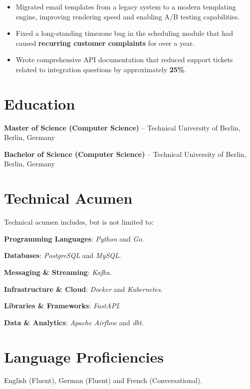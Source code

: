\documentclass{custom}
\begin{document}
\begin{itemize}\setlength{\itemsep}{-2pt}
\item Migrated email templates from a legacy system to a modern templating engine,
improving rendering speed and enabling A/B testing capabilities.
\item Fixed a long-standing timezone bug in the scheduling module that had caused
\textbf{recurring customer complaints} for over a year.
\item Wrote comprehensive API documentation that reduced support tickets related
to integration questions by approximately \textbf{25\%}.
\end{itemize}
\priorheading
{}
\section{Education}
\label{education}
\textbf{Master of Science (Computer Science)} – Technical University of Berlin,
Berlin, Germany

\textbf{Bachelor of Science (Computer Science)} – Technical University of Berlin,
Berlin, Germany
\section{Technical Acumen}
\label{technical-acumen}
Technical acumen includes, but is not limited to:

\textbf{Programming Languages}: \emph{Python} and \emph{Go}.

\textbf{Databases}: \emph{PostgreSQL} and \emph{MySQL}.

\textbf{Messaging \& Streaming}: \emph{Kafka}.

\textbf{Infrastructure \& Cloud}: \emph{Docker} and \emph{Kubernetes}.

\textbf{Libraries \& Frameworks}: \emph{FastAPI}.

\textbf{Data \& Analytics}: \emph{Apache Airflow} and \emph{dbt}.
\section{Language Proficiencies}
\label{languages}
English (Fluent), German (Fluent) and French (Conversational).
\end{document}
